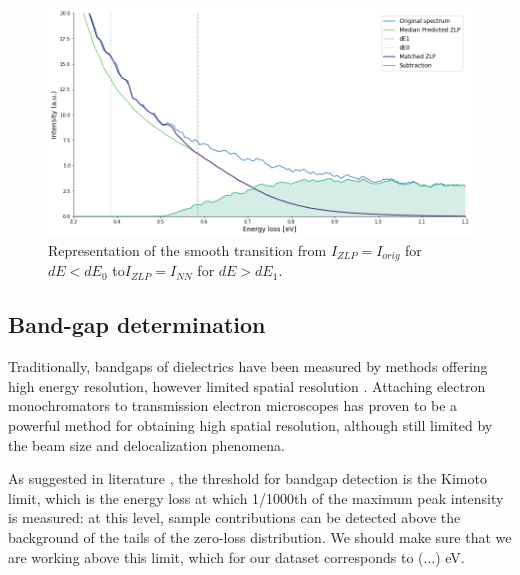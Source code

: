 \documentclass[11pt,a4paper]{article}
\numberwithin{equation}{section}
\numberwithin{figure}{section}
\numberwithin{table}{section}
\begin{document}
\begin{figure}[H]
    \centering
    \includegraphics[width=120mm]{plots/matching.png}
    \caption{Representation of the smooth transition from $I_{ZLP} = I_{orig}$ for $dE<dE_0$ to$I_{ZLP} = I_{NN}$ for $dE>dE_1$. }
    \label{fig:my_label}
\end{figure}

\subsection{Band-gap determination}
Traditionally, bandgaps of dielectrics have been measured by methods offering high energy resolution, however limited spatial resolution \cite{Park:2008}. Attaching electron monochromators to transmission electron microscopes has proven to be a powerful method for obtaining high spatial resolution, although still limited by the beam size and delocalization phenomena. 

As suggested in literature \cite{15,14}, the threshold for bandgap detection is the Kimoto limit, which is the energy loss at which 1/1000th of the maximum peak intensity is measured: at this level, sample contributions can be detected above the background of the tails of the zero-loss distribution. We should make sure that we are working above this limit, which for our dataset corresponds to (...) eV.\\
\end{document}
